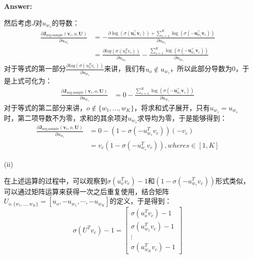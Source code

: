 \documentclass{article}
\newenvironment{answer}{
    {\bf Answer:} \sf \begingroup \color{red}%
}{\par\endgroup}%
\begin{document}
\begin{enumerate}[label=(\alph*)]
\begin{shaded}
\begin{answer}
然后考虑$J$对$u_{w_s}$的导数：
\begin{equation}
	\begin{array}{cl}
 \frac{\partial \bm J_{\text{neg-sample}}(\bm v_c, o, \bm U)}{\partial  u_{w_s}} &= -\frac{\partial \log(\sigma(\bm u_o^\top \bm v_c)) + \sum_{s=1}^K \log(\sigma(-\bm u_{w_s}^\top \bm v_c)) }{\partial u_{w_s}}\\ 	
 &= \frac{\partial log(\sigma(u_o^T v_c))}{\partial u_{w_s}}- \frac{\sum_{s=1}^K \log(\sigma(-\bm u_{w_s}^\top \bm v_c))}{\partial u_{w_s}}
 \end{array}
\end{equation}
对于等式的第一部分$\frac{\partial log(\sigma(u_o^T v_c))}{\partial u_{w_s}}$来讲，我们有$u_o \notin u_{w_s}$，所以此部分导数为0，于是上式可化为：
\begin{equation}
	\begin{array}{cl}
 \frac{\partial \bm J_{\text{neg-sample}}(\bm v_c, o, \bm U)}{\partial  u_{w_s}} &=  0 -\frac{\sum_{s=1}^K \log(\sigma(-\bm u_{w_s}^\top \bm v_c))}{\partial u_{w_s}}
 \end{array} 
\end{equation}
对于等式的第二部分来讲，$o \notin \{w_1,\dots,w_K\}$，将求和式子展开，只有$u_{w_s} = u_{w_s}$时，第二项导数不为零，求和的其余项对$u_{w_s}$求导均为零，于是能够得到：
\begin{equation}
	\begin{array}{cl}
 \frac{\partial \bm J_{\text{neg-sample}}(\bm v_c, o, \bm U)}{\partial  u_{w_s}} &=  0-(1-\sigma(-u_{w_s}^Tv_c))(-v_c) \\
 & = v_c(1-\sigma(-u_{w_s}^Tv_c)) , where s\in [1,K]
 \end{array}
\end{equation}

(ii)

在上述运算的过程中，可以观察到$\sigma(u_o^T v_c)-1$和$(1-\sigma(-u_{w_s}^T v_c))$形式类似，可以通过矩阵运算来获得一次之后重复使用，结合矩阵$U_{o,\{w_1,\dots,w_K\}}=\left[u_o,-u_{w_1},\cdots,-u_{w_K}\right]$的定义，于是得到：
\begin{equation}
	\sigma(U^T v_c)-1 = \left[
	\begin{array}{c}
		\sigma(u_o^T v_c)-1 \\
		\sigma(u_{w_1}^T v_c)-1 \\
		\vdots \\
		\sigma(u_{w_K}^T v_c)-1
	\end{array}
	\right]
\end{equation}



\end{answer}
\end{shaded}
\end{enumerate}
\end{document}
